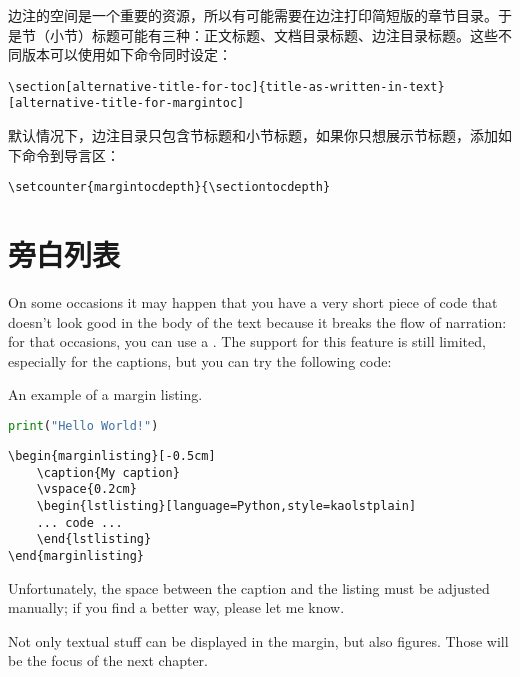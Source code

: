 边注的空间是一个重要的资源，所以有可能需要在边注打印简短版的章节目录。于是节（小节）标题可能有三种：正文标题、文档目录标题、边注目录标题。这些不同版本可以使用如下命令同时设定：

\begin{lstlisting}[style=kaolstplain]
\section[alternative-title-for-toc]{title-as-written-in-text}[alternative-title-for-margintoc]
\end{lstlisting}

默认情况下，边注目录只包含节标题和小节标题，如果你只想展示节标题，添加如下命令到导言区：

\begin{lstlisting}[style=kaolstplain]
\setcounter{margintocdepth}{\sectiontocdepth}
\end{lstlisting}

\section{旁白列表}

On some occasions it may happen that you have a very short piece of code
that doesn't look good in the body of the text because it breaks the
flow of narration: for that occasions, you can use a
. The support for this feature is still
limited, especially for the captions, but you can try the following
code:

\begin{marginlisting}[-1.35cm]
	\caption{An example of a margin listing.}
	\vspace{0.6cm}
	\begin{lstlisting}[language=Python,style=kaolstplain]
print("Hello World!")
	\end{lstlisting}
\end{marginlisting}

\begin{verbatim}
\begin{marginlisting}[-0.5cm]
	\caption{My caption}
	\vspace{0.2cm}
	\begin{lstlisting}[language=Python,style=kaolstplain]
	... code ...
	\end{lstlisting}
\end{marginlisting}
\end{verbatim}

Unfortunately, the space between the caption and the listing must be
adjusted manually; if you find a better way, please let me know.

Not only textual stuff can be displayed in the margin, but also figures.
Those will be the focus of the next chapter.
